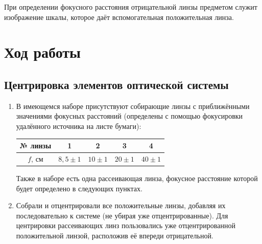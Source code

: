\documentclass[a4paper, 12pt]{article}%
\begin{document}
	При определении фокусного расстояния отрицательной линзы предметом
	служит изображение шкалы, которое даёт вспомогательная положительная
	линза.
	
	\section{Ход работы}
	
	\subsection{Центрировка элементов оптической системы}
	\begin{enumerate}
		
		\item В имеющемся наборе присутствуют собирающие линзы с приближёнными значениями фокусных расстояний (определены с помощью фокусировки удалённого источника на листе бумаги):
		\begin{center}
			\begin{tabular}{|c|c|c|c|c|}
				\hline
				№ линзы & 1 & 2 & 3 & 4 \\ \hline
				$f$, см & $8,5\pm1$ & $10\pm1$ & $20\pm1$ & $40\pm1$ \\ \hline
			\end{tabular}
		\end{center}
		Также в наборе есть одна рассеивающая линза, фокусное расстояние которой будет определено в следующих пунктах.
		
		\item Собрали и отцентрировали все положительные линзы, добавляя их последовательно к системе (не убирая уже отцентрированные). Для центрировки рассеивающих линз пользовались уже отцентрированной положительной линзой, расположив её впереди отрицательной.
		
	\end{enumerate}
\end{document}
